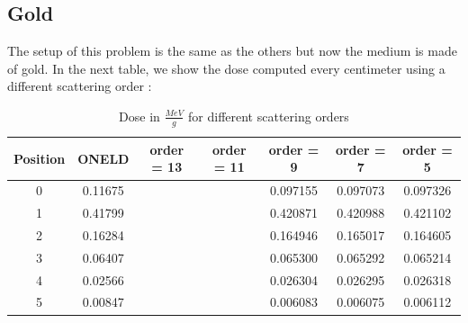\subsection{Gold}
The setup of this problem is the same as the others but now the medium is 
made of gold. In the next table, we show the dose computed every centimeter 
using a different scattering order :
\begin{table}[H]
\begin{center}
\caption{Dose in $\frac{MeV}{g}$ for different scattering orders}
\begin{tabular}{|c|c|c|c|c|c|c|}
\hline
Position & ONELD & order = 13 & order = 11 & order = 9 & order = 7 & order = 5 \\
\hline
0 & 0.11675 &  &  & 0.097155 & 0.097073 & 0.097326 \\
1 & 0.41799 &  &  & 0.420871 & 0.420988 & 0.421102 \\
2 & 0.16284 &  &  & 0.164946 & 0.165017 & 0.164605 \\
3 & 0.06407 &  &  & 0.065300 & 0.065292 & 0.065214 \\
4 & 0.02566 &  &  & 0.026304 & 0.026295 & 0.026318 \\
5 & 0.00847 &  &  & 0.006083 & 0.006075 & 0.006112 \\
\hline
\end{tabular}
\end{center}
\end{table}                

